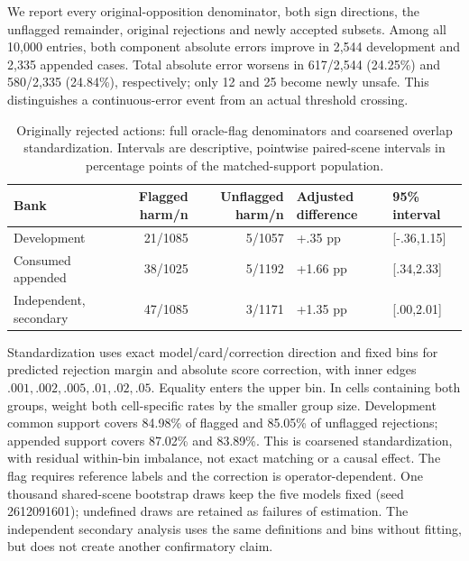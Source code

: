 We report every original-opposition denominator, both sign directions, the
unflagged remainder, original rejections and newly accepted subsets. Among all
10,000 entries, both component absolute errors improve in 2,544 development
and 2,335 appended cases. Total absolute error worsens in 617/2,544 (24.25\%)
and 580/2,335 (24.84\%), respectively; only 12 and 25 become newly unsafe.
This distinguishes a continuous-error event from an actual threshold crossing.

\begin{table}[h]
\centering\small
\caption{Originally rejected actions: full oracle-flag denominators and coarsened overlap standardization. Intervals are descriptive, pointwise paired-scene intervals in percentage points of the matched-support population.}
\begin{tabular}{lrrll}
\toprule
Bank & Flagged harm/n & Unflagged harm/n & Adjusted difference & 95\% interval\\
\midrule
Development &21/1085&5/1057&+.35 pp&[-.36,1.15]\\
Consumed appended &38/1025&5/1192&+1.66 pp&[.34,2.33]\\
Independent, secondary &47/1085&3/1171&+1.35 pp&[.00,2.01]\\
\bottomrule
\end{tabular}
\end{table}

Standardization uses exact model/card/correction direction and fixed bins for
predicted rejection margin and absolute score correction, with inner edges
$.001,.002,.005,.01,.02,.05$. Equality enters the upper bin. In cells containing
both groups, weight both cell-specific rates by the smaller group size.
Development common support covers 84.98\% of flagged and 85.05\% of unflagged
rejections; appended support covers 87.02\% and 83.89\%. This is coarsened
standardization, with residual within-bin imbalance, not exact matching or a
causal effect. The flag requires reference labels and the correction is
operator-dependent. One thousand shared-scene bootstrap draws keep the five
models fixed (seed 2612091601); undefined draws are retained as failures of
estimation. The independent secondary analysis uses the same definitions and
bins without fitting, but does not create another confirmatory claim.

